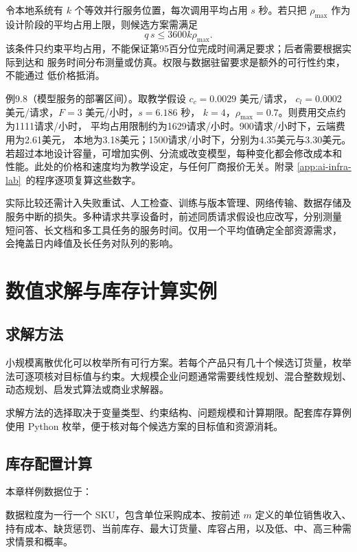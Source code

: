 令本地系统有 \(k\) 个等效并行服务位置，每次调用平均占用 \(s\) 秒。若只把
\(\rho_{\max}\) 作为设计阶段的平均占用上限，则候选方案需满足
\[
  q\,s\le 3600k\rho_{\max}.
\]
该条件只约束平均占用，不能保证第95百分位完成时间满足要求；后者需要根据实际到达和
服务时间分布测量或仿真。权限与数据驻留要求是额外的可行性约束，不能通过
低价格抵消。

例9.8（模型服务的部署区间）。取教学假设 \(c_c=0.0029\) 美元/请求，
\(c_l=0.0002\) 美元/请求，\(F=3\) 美元/小时，\(s=6.186\) 秒，
\(k=4\)，\(\rho_{\max}=0.7\)。则费用交点约为1111请求/小时，
平均占用限制约为1629请求/小时。900请求/小时下，云端费用为2.61美元，
本地为3.18美元；1500请求/小时下，分别为4.35美元与3.30美元。
若超过本地设计容量，可增加实例、分流或改变模型，每种变化都会修改成本和
性能。此处的价格和速度均为教学设定，与任何厂商报价无关。附录
\ref{app:ai-infra-lab}~的程序逐项复算这些数字。

实际比较还需计入失败重试、人工检查、训练与版本管理、网络传输、数据存储及
服务中断的损失。多种请求共享设备时，前述同质请求假设也应改写，分别测量
短问答、长文档和多工具任务的服务时间。仅用一个平均值确定全部资源需求，
会掩盖日内峰值及长任务对队列的影响。

\section{数值求解与库存计算实例}
\subsection{求解方法}

小规模离散优化可以枚举所有可行方案。若每个产品只有几十个候选订货量，枚举法可逐项核对目标值与约束。大规模企业问题通常需要线性规划、混合整数规划、动态规划、启发式算法或商业求解器。

求解方法的选择取决于变量类型、约束结构、问题规模和计算期限。配套库存算例使用 Python 枚举，便于核对每个候选方案的目标值和资源消耗。

\subsection{库存配置计算}

本章样例数据位于：
\begin{center}
\end{center}
数据粒度为一行一个 SKU，包含单位采购成本、按前述 \(m\) 定义的单位销售收入、持有成本、缺货惩罚、当前库存、最大订货量、库容占用，以及低、中、高三种需求情景和概率。


